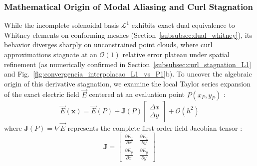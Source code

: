 \documentclass[preprint,12pt]{elsarticle}
\begin{document}
\subsubsection{Mathematical Origin of Modal Aliasing and Curl Stagnation}
\label{subsec:L1_aliasing_analysis}

While the incomplete solenoidal basis $\mathcal{L}^1$ exhibits exact dual equivalence to Whitney elements on conforming meshes (Section~\ref{subsubsec:dual_whitney}), its behavior diverges sharply on unconstrained point clouds, where curl approximations stagnate at an $\mathcal{O}(1)$ relative error plateau under spatial refinement (as numerically confirmed in Section~\ref{subsubsec:curl_stagnation_L1} and Fig.~\ref{fig:convergencia_interpolacao_L1_vs_P1}b). To uncover the algebraic origin of this derivative stagnation, we examine the local Taylor series expansion of the exact electric field $\vec{E}$ centered at an evaluation point $P(x_P, y_P)$ \cite{li2007meshfree, liu2009mesh}:
\begin{equation}
    \vec{E}(\mathbf{x}) = \vec{E}(P) + \mathbf{J}(P) \begin{bmatrix} \Delta x \\[2pt] \Delta y \end{bmatrix} + \mathcal{O}(h^2)
    \label{eq:taylor_vector_expansion}
\end{equation}
where $\mathbf{J}(P) = \nabla \vec{E}$ represents the complete first-order field Jacobian tensor \cite{liu2009mesh}:
\begin{equation}
    \mathbf{J} = \begin{bmatrix}
        \frac{\partial E_x}{\partial x} & \frac{\partial E_x}{\partial y} \\[4pt]
        \frac{\partial E_y}{\partial x} & \frac{\partial E_y}{\partial y}
    \end{bmatrix}
    \label{eq:jacobian_tensor_raw}
\end{equation}
\end{document}
